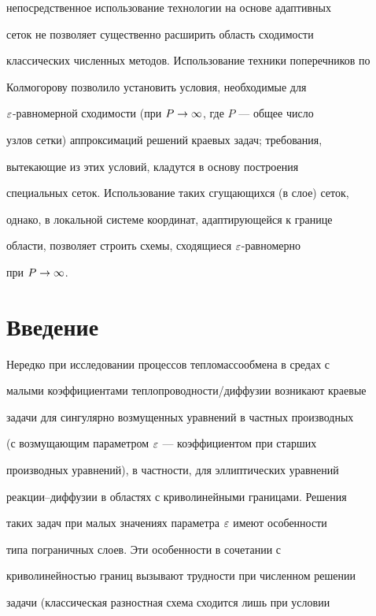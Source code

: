 непосредственное использование технологии на основе адаптивных


сеток не позволяет существенно расширить область сходимости


классических численных методов. Использование техники поперечников по


Колмогорову позволило установить условия, необходимые для


$\varepsilon$-равномерной сходимости (при $P\rightarrow\infty$, где $P$ --- общее число


узлов сетки) аппроксимаций решений краевых задач; требования,


вытекающие из этих условий, кладутся в основу построения


специальных сеток. Использование таких сгущающихся (в слое) сеток,


однако, в локальной системе координат, адаптирующейся к границе


области, позволяет строить схемы, сходящиеся $\varepsilon$-равномерно


при $P\rightarrow\infty$.








\section{Введение}


\label{section.1}





Нередко при исследовании процессов тепломассообмена в средах с


малыми коэффициентами теплопроводности/диффузии возникают краевые


задачи для сингулярно возмущенных уравнений в частных производных


(с возмущающим параметром $\varepsilon$ --- коэффициентом при старших


производных уравнений), в частности, для эллиптических уравнений


реакции--диффузии в областях с криволинейными границами. Решения


таких задач при малых значениях параметра $\varepsilon$ имеют особенности


типа пограничных слоев. Эти особенности в сочетании с


криволинейностью границ вызывают трудности при численном решении


задачи (классическая разностная схема сходится лишь при условии


